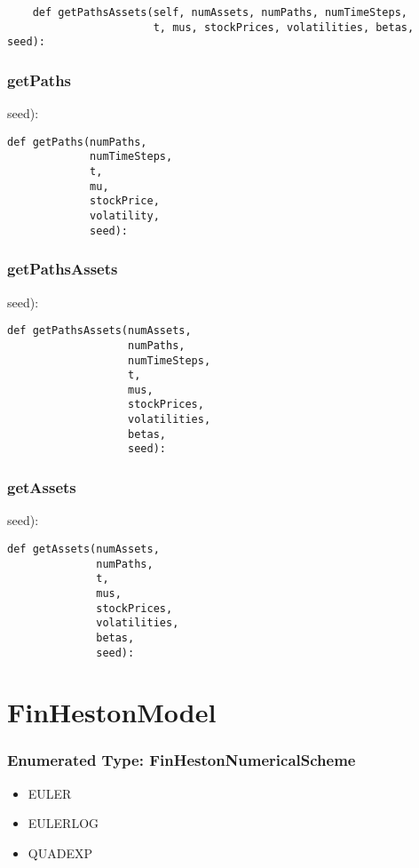 \documentclass[twoside,11pt]{book}
\begin{document}
\begin{lstlisting}
    def getPathsAssets(self, numAssets, numPaths, numTimeSteps,
                       t, mus, stockPrices, volatilities, betas, seed):
\end{lstlisting}

\subsubsection*{{\bf getPaths}}
seed): 

\begin{lstlisting}
def getPaths(numPaths,
             numTimeSteps,
             t,
             mu,
             stockPrice,
             volatility,
             seed):
\end{lstlisting}

\subsubsection*{{\bf getPathsAssets}}
seed): 

\begin{lstlisting}
def getPathsAssets(numAssets,
                   numPaths,
                   numTimeSteps,
                   t,
                   mus,
                   stockPrices,
                   volatilities,
                   betas,
                   seed):
\end{lstlisting}

\subsubsection*{{\bf getAssets}}
seed): 

\begin{lstlisting}
def getAssets(numAssets,
              numPaths,
              t,
              mus,
              stockPrices,
              volatilities,
              betas,
              seed):
\end{lstlisting}

\newpage
\section{FinHestonModel}

\subsubsection{Enumerated Type: FinHestonNumericalScheme}
\begin{itemize}
\item{EULER}
\item{EULERLOG}
\item{QUADEXP}
\end{itemize}
\end{document}
